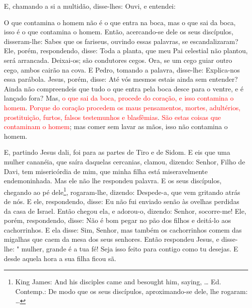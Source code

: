 E, chamando a si a multidão, disse-lhes: Ouvi, e entendei:

O que contamina o homem não é o que entra na boca, mas o que sai
da boca, isso é o que contamina o homem. Então, acercando-se
dele os seus discípulos, disseram-lhe: Sabes que os fariseus,
ouvindo essas palavras, se escandalizaram? Ele, porém,
respondendo, disse: Toda a planta, que meu Pai celestial não
plantou, será arrancada. Deixai-os; são condutores cegos.
Ora, se um cego guiar outro cego, ambos cairão na cova. E
Pedro, tomando a palavra, disse-lhe: Explica-nos essa parábola.
Jesus, porém, disse: Até vós mesmos estais ainda sem
entender? Ainda não compreendeis que tudo o que entra pela
boca desce para o ventre, e é lançado fora? Mas, \textcolor{red}{o
que sai da boca, procede do coração, e isso contamina o homem}.
\textcolor{red}{Porque do coração procedem os maus pensamentos,
mortes, adultérios, prostituição, furtos, falsos testemunhos e
blasfêmias}. \textcolor{red}{São estas coisas que contaminam o
homem}; mas comer sem lavar as mãos, isso não contamina o homem.

E, partindo Jesus dali, foi para as partes de Tiro e de Sidom.
E eis que uma mulher cananéia, que saíra daquelas cercanias,
clamou, dizendo: Senhor, Filho de Davi, tem misericórdia de mim, que
minha filha está miseravelmente endemoninhada. Mas ele não
lhe respondeu palavra. E os seus discípulos, chegando ao pé
dele\footnote{King James: And his disciples came and besought him,
saying, \ldots{} Ed. Contemp.: De modo que os seus discípulos,
aproximando-se dele, lhe rogaram: \ldots{}}, rogaram-lhe, dizendo:
Despede-a, que vem gritando atrás de nós. E ele, respondendo,
disse: Eu não fui enviado senão às ovelhas perdidas da casa de
Israel. Então chegou ela, e adorou-o, dizendo: Senhor,
socorre-me! Ele, porém, respondendo, disse: Não é bom pegar
no pão dos filhos e deitá-lo aos cachorrinhos. E ela disse:
Sim, Senhor, mas também os cachorrinhos comem das migalhas que caem
da mesa dos seus senhores. Então respondeu Jesus, e
disse-lhe: " mulher, grande é a tua fé! Seja isso feito para contigo
como tu desejas. E desde aquela hora a sua filha ficou sã.

